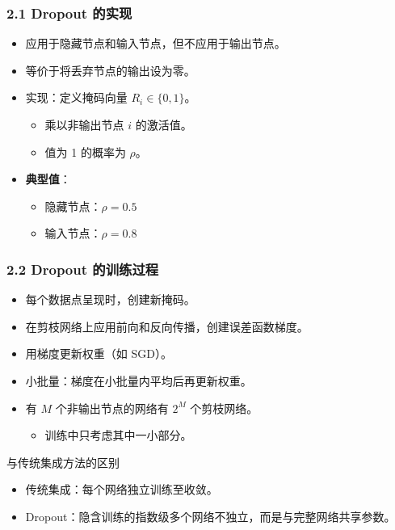 \documentclass[t,aspectratio=169]{beamer} %
\begin{document}
\begin{frame}
    \frametitle{2.1 Dropout 的实现}
    \begin{itemize}
        \item 应用于\alert{隐藏节点和输入节点}，但\alert{不应用于输出节点}。
        \item 等价于将丢弃节点的输出设为\alert{零}。
        \item 实现：定义\alert{掩码向量} $R_i \in \{0, 1\}$。
        \begin{itemize}
            \item 乘以非输出节点 $i$ 的激活值。
            \item 值为 1 的概率为 $\rho$。
        \end{itemize}
        \item \textbf{典型值}：
        \begin{itemize}
            \item 隐藏节点：$\rho = 0.5$
            \item 输入节点：$\rho = 0.8$
        \end{itemize}
    \end{itemize}
\end{frame}

\begin{frame}
    \frametitle{2.2 Dropout 的训练过程}
    \begin{itemize}
        \item 每个数据点呈现时，创建\alert{新掩码}。
        \item 在剪枝网络上应用前向和反向传播，创建误差函数梯度。
        \item 用梯度更新权重（如 SGD）。
        \item 小批量：梯度在小批量内平均后再更新权重。
        \item 有 $M$ 个非输出节点的网络有 $2^M$ 个剪枝网络。
        \begin{itemize}
            \item 训练中只考虑其中\alert{一小部分}。
        \end{itemize}
    \end{itemize}
    \begin{block}{与传统集成方法的区别}
        \begin{itemize}
            \item 传统集成：每个网络\alert{独立训练至收敛}。
            \item Dropout：隐含训练的指数级多个网络\alert{不独立}，而是与完整网络\alert{共享参数}。
        \end{itemize}
    \end{block}
\end{frame}
\end{document}
